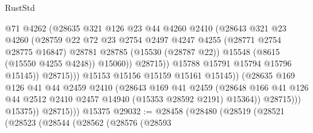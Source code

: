 \begin{lexlean}{RustStd}
\begin{coremodule}
                                  @71
                                  @4262
                                  (@28635
                                    @321
                                    @126
                                    @23
                                    @44
                                    @4260
                                    @2410
                                    (@28643
                                      @321
                                      @23
                                      @4260
                                      (@28759
                                        @22
                                        @72
                                        @23
                                        @2754
                                        @2497
                                        @4247
                                        @4255
                                        (@28771 @2754 @28775 @16847)
                                        @28781
                                        @28785
                                        (@15530 (@28787 @22))
                                        @15548
                                        (@8615 (@15550 @4255 @4248))
                                        @15060))
                                    @28715))
                                @15788
                                @15791
                                @15794
                                @15796
                                @15145))
                            @28715)))
                      @15153
                      @15156
                      @15159
                      @15161
                      @15145))
                  (@28635
                    @169
                    @126
                    @41
                    @44
                    @2459
                    @2410
                    (@28643
                      @169
                      @41
                      @2459
                      (@28648
                        @166
                        @41
                        @126
                        @44
                        @2512
                        @2410
                        @2457
                        @14940
                        (@15353 @28592 @2191)
                        @15364))
                    @28715)))
              @15375))
          @28715)))
    @15375
@29032 := @28458
    (@28480
      (@28519
        (@28521
          (@28523
            (@28544
              (@28562
                (@28576
                  (@28593

\end{coremodule}
\end{lexlean}
